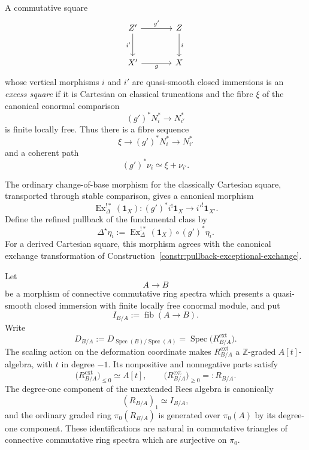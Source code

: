 \begin{definition}
\label{def:closed-excess-square}
A commutative square
\[
\begin{tikzcd}[column sep=large,row sep=large]
    Z' \arrow[r,"g'"] \arrow[d,"i'"']
        & Z \arrow[d,"i"] \\
    X' \arrow[r,"g"']
        & X
\end{tikzcd}
\]
whose vertical morphisms \(i\) and \(i'\) are quasi-smooth closed
immersions is an \emph{excess square} if it is Cartesian on classical
truncations and the fibre \(\xi\) of the canonical
conormal comparison
\[
    (g')^*N_i^*
    \longrightarrow
    N_{i'}^*
\]
is finite locally free.  Thus there is a fibre sequence
\[
    \xi
    \longrightarrow
    (g')^*N_i^*
    \longrightarrow
    N_{i'}^*
\]
and a coherent path
\[
    (g')^*\nu_i
    \simeq
    \xi+\nu_{i'}.
\]

The ordinary change-of-base morphism for the classically Cartesian square,
transported through stable comparison, gives a canonical morphism
\[
    \operatorname{Ex}^{!*}_\Delta(\mathbf1_X):
    (g')^*i^!\mathbf1_X
    \longrightarrow
    i'^!\mathbf1_{X'}.
\]
Define the refined pullback of the fundamental class by
\[
    \Delta^\star\eta_i
    :=
    \operatorname{Ex}^{!*}_\Delta(\mathbf1_X)
    \circ
    (g')^*\eta_i.
\]
For a derived Cartesian square, this morphism agrees with the canonical
exchange transformation of
Construction~\ref{constr:pullback-exceptional-exchange}.
\end{definition}

\begin{lemma}
\label{lem:affine-extended-rees-deformation}
Let
\[
    A\longrightarrow B
\]
be a morphism of connective commutative ring spectra which presents a
quasi-smooth closed immersion with finite locally free conormal module, and
put
\[
    I_{B/A}:=\operatorname{fib}(A\longrightarrow B).
\]
Write
\[
    D_{B/A}
    :=
    D_{\operatorname{Spec}(B)/\operatorname{Spec}(A)}
    =
    \operatorname{Spec}
    \bigl(
      R^{\mathrm{ext}}_{B/A}
    \bigr).
\]
The scaling action on the deformation coordinate makes
\(R^{\mathrm{ext}}_{B/A}\) a \(\mathbb Z\)-graded
\(A[t]\)-algebra, with \(t\) in degree \(-1\).  Its nonpositive and
nonnegative parts satisfy
\[
    \bigl(
      R^{\mathrm{ext}}_{B/A}
    \bigr)_{\leq0}
    \simeq
    A[t],
    \qquad
    \bigl(
      R^{\mathrm{ext}}_{B/A}
    \bigr)_{\geq0}
    =:
    R_{B/A}.
\]
The degree-one component of the unextended Rees algebra is canonically
\[
    (R_{B/A})_1
    \simeq
    I_{B/A},
\]
and the ordinary graded ring \(\pi_0(R_{B/A})\) is generated over
\(\pi_0(A)\) by its degree-one component.  These identifications are
natural in commutative triangles of connective commutative ring spectra
which are surjective on \(\pi_0\).
\end{lemma}

